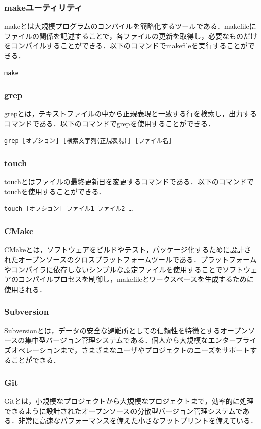 \documentclass[]{jsarticle}
\begin{document}
\subsubsection{makeユーティリティ}
makeとは大規模プログラムのコンパイルを簡略化するツールである．makefileにファイルの関係を記述することで，各ファイルの更新を取得し，必要なものだけをコンパイルすることができる．以下のコマンドでmakefileを実行することができる．
\begin{lstlisting}[]
make
\end{lstlisting}

\subsubsection{grep}
grepとは，テキストファイルの中から正規表現と一致する行を検索し，出力するコマンドである．以下のコマンドでgrepを使用することができる．
\begin{lstlisting}[]
grep [オプション] [検索文字列(正規表現)] [ファイル名]
\end{lstlisting}

\subsubsection{touch}
touchとはファイルの最終更新日を変更するコマンドである．以下のコマンドでtouchを使用することができる．
\begin{lstlisting}[]
touch [オプション] ファイル1 ファイル2 …
\end{lstlisting}

\subsubsection{CMake}
CMakeとは，ソフトウェアをビルドやテスト，パッケージ化するために設計されたオープンソースのクロスプラットフォームツールである．プラットフォームやコンパイラに依存しないシンプルな設定ファイルを使用することでソフトウェアのコンパイルプロセスを制御し，makefileとワークスペースを生成するために使用される．

\subsubsection{Subversion}
Subversionとは，データの安全な避難所としての信頼性を特徴とするオープンソースの集中型バージョン管理システムである．個人から大規模なエンタープライズオペレーションまで，さまざまなユーザやプロジェクトのニーズをサポートすることができる．

\subsubsection{Git}
Gitとは，小規模なプロジェクトから大規模なプロジェクトまで，効率的に処理できるように設計されたオープンソースの分散型バージョン管理システムである．非常に高速なパフォーマンスを備えた小さなフットプリントを備えている．
\end{document}
